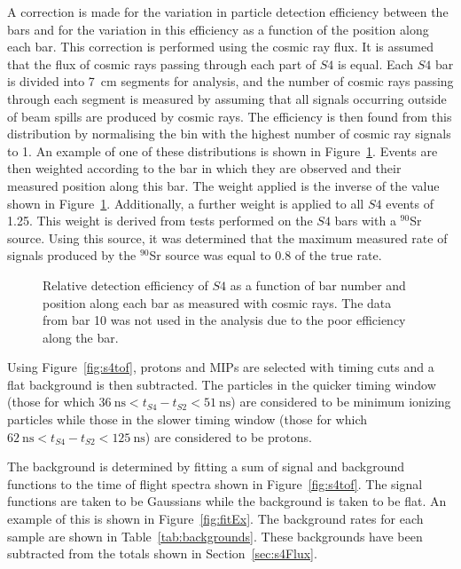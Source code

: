 A correction is made for the variation in particle detection efficiency between the bars and for the variation in this efficiency as a function of the position along each bar.
This correction is performed using the cosmic ray flux.
It is assumed that the flux of cosmic rays passing through each part of $\mathit{S4}$ is equal.
Each $\mathit{S4}$ bar is divided into 7~cm segments for analysis, and the number of cosmic rays passing through each segment is measured by assuming that all signals occurring outside of beam spills are produced by cosmic rays.
The efficiency is then found from this distribution by normalising the bin with the highest number of cosmic ray signals to 1.
An example of one of these distributions is shown in Figure~\ref{fig:s4PosEff}.
Events are then weighted according to the bar in which they are observed and their measured position along this bar.
The weight applied is the inverse of the value shown in Figure~\ref{fig:s4PosEff}.
Additionally, a further weight is applied to all $\mathit{S4}$ events of 1.25.
This weight is derived from tests performed on the $\mathit{S4}$ bars with a $^{90}$Sr source.
Using this source, it was determined that the maximum measured rate of signals produced by the $^{90}$Sr source was equal to 0.8 of the true rate.

\begin{figure}
  \begin{adjustbox}{width=.7\textwidth, center}
    
  \end{adjustbox}
  \caption{Relative detection efficiency of $\mathit{S4}$ as a function of bar number and position along each bar as measured with cosmic rays. The data from bar 10 was not used in the analysis due to the poor efficiency along the bar.}
  \label{fig:s4PosEff}
\end{figure}

Using Figure~\ref{fig:s4tof}, protons and MIPs are selected with timing cuts and a flat background is then subtracted.
The particles in the quicker timing window (those for which $36~\text{ns}<t_{\mathit{S4}}-t_{\mathit{S2}}<51~\text{ns}$) are considered to be minimum ionizing particles while those in the slower timing window (those for which $62~\text{ns}<t_{\mathit{S4}}-t_{\mathit{S2}}<125~\text{ns}$) are considered to be protons.

The background is determined by fitting a sum of signal and background functions to the time of flight spectra shown in Figure~\ref{fig:s4tof}.
The signal functions are taken to be Gaussians while the background is taken to be flat. 
An example of this is shown in Figure~\ref{fig:fitEx}.
The background rates for each sample are shown in Table~\ref{tab:backgrounds}.
These backgrounds have been subtracted from the totals shown in Section~\ref{sec:s4Flux}.


